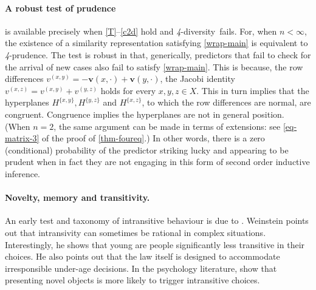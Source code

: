 \documentclass[12pt,a4paper,twoside]{article}
\newcommand{\xy}{{(x, y)}}
\newcommand{\yz}{{(y,z)}}
\newcommand{\xz}{{(x,z)}}
\newcommand{\fourpru}{\textit{4}-\textup{prudence}}
\newcommand{\fourdiv}{\textit{4}-\textup{diversity}}
\begin{document}
\paragraph{A robust test of prudence\hskip-7pt} is available precisely when
\ref{T}--\ref{c2d} hold and \fourdiv\ fails. For, when $n<\infty$, the existence
of a similarity representation satisfying \cref{wrap-main} is equivalent to
\fourpru. The test is robust in that, generically, predictors that fail to check
for the arrival of new cases also fail to satisfy \cref{wrap-main}. This is
because, the row differences
$v^\xy = - \mathbf{v}(x,\cdot) + \mathbf{v}(y,\cdot)$, the Jacobi identity
$v^{\xz} = v^{\xy} + v^{\yz}$ holds for every $x,y,z \in X$. This in turn
implies that the hyperplanes $H^{\{x,y\}}, H^{\{y,z\}}$ and $H^{\{x,z\}}$, to
which the row differences are normal, are congruent. Congruence implies the
hyperplanes are not in general position. (When $n = 2$, the same argument can be
made in terms of extensions: see \cref{eq-matrix-3} of the proof of
\cref{thm-foureq}.) In other words, there is a zero (conditional) probability of
the predictor striking lucky and appearing to be prudent when in fact they are
not engaging in this form of second order inductive inference.

\paragraph{Novelty, memory and transitivity.} An early test and taxonomy of
intransitive behaviour is due to
\citet{Weinstein-Intransitivity,Weinstein-Transitivity}. Weinstein points out
that intransivity can sometimes be rational in complex situations.
Interestingly, he shows that young are people significantly less transitive in their
choices. He also points out that the law itself is designed to accommodate
irresponsible under-age decisions. In the psychology literature,
\citet{BR-Novelty_and_intransitivity} show that presenting novel objects is more
likely to trigger intransitive choices.
\end{document}
